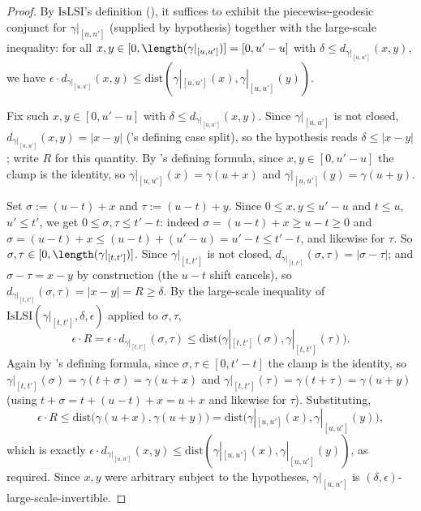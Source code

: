 \begin{proof}
  By $\mathrm{IsLSI}$'s definition (), it suffices to exhibit the piecewise-geodesic
  conjunct for $\gamma|_{[u,u']}$ (supplied by hypothesis) together with the large-scale
  inequality: for all $x,y \in [0,\length(\gamma|_{[u,u']})] = [0,u'-u]$ with $\delta \le
  d_{\gamma|_{[u,u']}}(x,y)$, we have $\epsilon \cdot d_{\gamma|_{[u,u']}}(x,y) \le
  \mathrm{dist}(\gamma|_{[u,u']}(x),\gamma|_{[u,u']}(y))$.

  Fix such $x,y \in [0,u'-u]$ with $\delta \le d_{\gamma|_{[u,u']}}(x,y)$. Since
  $\gamma|_{[u,u']}$ is not closed, $d_{\gamma|_{[u,u']}}(x,y) = |x-y|$
  ('s defining case split), so the hypothesis reads $\delta \le |x-y|$; write $R$
  for this quantity. By 's defining formula, since $x,y \in [0,u'-u]$ the
  clamp is the identity, so $\gamma|_{[u,u']}(x) = \gamma(u+x)$ and $\gamma|_{[u,u']}(y) =
  \gamma(u+y)$.

  Set $\sigma := (u-t)+x$ and $\tau := (u-t)+y$. Since $0 \le x,y \le u'-u$ and $t \le u$, $u' \le
  t'$, we get $0 \le \sigma,\tau \le t'-t$: indeed $\sigma = (u-t)+x \ge u-t \ge 0$ and $\sigma =
  (u-t)+x \le (u-t)+(u'-u) = u'-t \le t'-t$, and likewise for $\tau$. So $\sigma,\tau \in
  [0,\length(\gamma|_{[t,t']})]$. Since $\gamma|_{[t,t']}$ is not closed,
  $d_{\gamma|_{[t,t']}}(\sigma,\tau) = |\sigma-\tau|$; and $\sigma-\tau = x-y$ by construction
  (the $u-t$ shift cancels), so $d_{\gamma|_{[t,t']}}(\sigma,\tau) = |x-y| = R \ge \delta$. By the
  large-scale inequality of $\mathrm{IsLSI}(\gamma|_{[t,t']},\delta,\epsilon)$ applied to
  $\sigma,\tau$,
  \[
    \epsilon \cdot R = \epsilon \cdot d_{\gamma|_{[t,t']}}(\sigma,\tau)
      \le \mathrm{dist}\bigl(\gamma|_{[t,t']}(\sigma), \gamma|_{[t,t']}(\tau)\bigr)
    .
  \]
  Again by 's defining formula, since $\sigma,\tau \in [0,t'-t]$ the clamp
  is the identity, so $\gamma|_{[t,t']}(\sigma) = \gamma(t+\sigma) = \gamma(u+x)$ and
  $\gamma|_{[t,t']}(\tau) = \gamma(t+\tau) = \gamma(u+y)$ (using $t+\sigma = t+(u-t)+x = u+x$ and
  likewise for $\tau$). Substituting,
  \[
    \epsilon \cdot R \le \mathrm{dist}\bigl(\gamma(u+x),\gamma(u+y)\bigr)
      = \mathrm{dist}\bigl(\gamma|_{[u,u']}(x),\gamma|_{[u,u']}(y)\bigr)
    ,
  \]
  which is exactly $\epsilon \cdot d_{\gamma|_{[u,u']}}(x,y) \le
  \mathrm{dist}(\gamma|_{[u,u']}(x),\gamma|_{[u,u']}(y))$, as required. Since $x,y$ were arbitrary
  subject to the hypotheses, $\gamma|_{[u,u']}$ is $(\delta,\epsilon)$-large-scale-invertible.
\end{proof}

